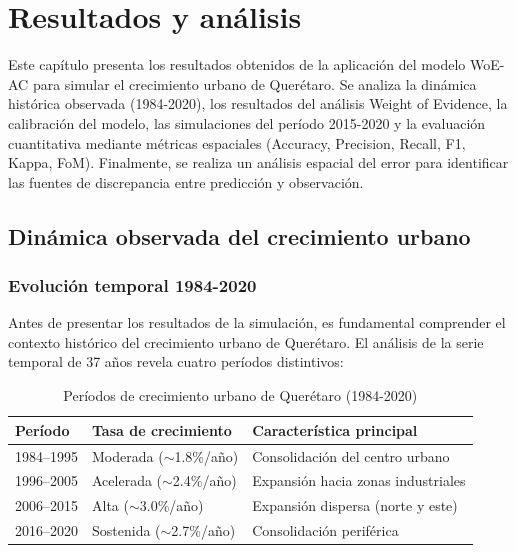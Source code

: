
\chapter{Resultados y análisis}
\label{ch:resultados-analisis}

\begin{resumen}
Este capítulo presenta los resultados obtenidos de la aplicación del modelo WoE-AC para simular el crecimiento urbano de Querétaro. Se analiza la dinámica histórica observada (1984-2020), los resultados del análisis Weight of Evidence, la calibración del modelo, las simulaciones del período 2015-2020 y la evaluación cuantitativa mediante métricas espaciales (Accuracy, Precision, Recall, F1, Kappa, FoM). Finalmente, se realiza un análisis espacial del error para identificar las fuentes de discrepancia entre predicción y observación.
\end{resumen}

\section{Dinámica observada del crecimiento urbano}

\subsection{Evolución temporal 1984-2020}

Antes de presentar los resultados de la simulación, es fundamental comprender el contexto histórico del crecimiento urbano de Querétaro. El análisis de la serie temporal de 37 años revela cuatro períodos distintivos:

\begin{table}[htbp]
\centering
\caption{Períodos de crecimiento urbano de Querétaro (1984-2020)}
\label{tab:growth_periods}
\begin{tabular}{lll}
\toprule
\textbf{Período} & \textbf{Tasa de crecimiento} & \textbf{Característica principal} \\
\midrule
1984--1995 & Moderada ($\sim$1.8\%/año) & Consolidación del centro urbano \\
1996--2005 & Acelerada ($\sim$2.4\%/año) & Expansión hacia zonas industriales \\
2006--2015 & Alta ($\sim$3.0\%/año) & Expansión dispersa (norte y este) \\
2016--2020 & Sostenida ($\sim$2.7\%/año) & Consolidación periférica \\
\bottomrule
\end{tabular}
\end{table}

